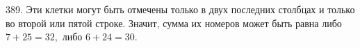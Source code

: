 389. Эти клетки могут быть отмечены только в двух последних столбцах и только во второй или пятой строке. Значит, сумма их номеров может быть равна либо $7+25=32,$ либо $6+24=30.$\\
